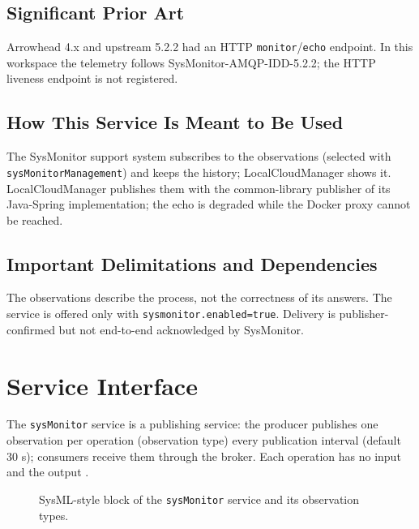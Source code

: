 \documentclass[a4paper]{arrowhead}
\newcommand{\mref}[2][]{{\textcolor{ArrowheadPurple}{\hyperref[sec:model:#2]{\ifstrempty{#1}{#2}{#1}}}}}
\begin{document}
\subsection{Significant Prior Art}

Arrowhead 4.x and upstream 5.2.2 had an HTTP \texttt{monitor}/\texttt{echo} endpoint. In this workspace the telemetry follows SysMonitor-AMQP-IDD-5.2.2; the HTTP liveness endpoint is not registered.

\subsection{How This Service Is Meant to Be Used}

The SysMonitor support system subscribes to the observations (selected with \texttt{sys\allowbreak{}Monitor\allowbreak{}Management}) and keeps the history; LocalCloudManager shows it. LocalCloudManager publishes them with the common-library publisher of its Java-Spring implementation; the echo is degraded while the Docker proxy cannot be reached.

\subsection{Important Delimitations and Dependencies}
\label{sec:delimitations}

The observations describe the process, not the correctness of its answers. The service is offered only with \texttt{sysmonitor.\allowbreak{}enabled=\allowbreak{}true}. Delivery is publisher-confirmed but not end-to-end acknowledged by SysMonitor.

\newpage

\section{Service Interface}
\label{sec:operations}

The \texttt{sysMonitor} service is a publishing service: the producer publishes one observation per operation (observation type) every publication interval (default 30 s); consumers receive them through the broker. Each operation has no input and the output \mref{Observation}.

\begin{figure}[ht!]
  \centering
  \caption{SysML-style block of the \texttt{sysMonitor} service and its observation types.}
  \label{fig:SD}
\end{figure}
\end{document}
